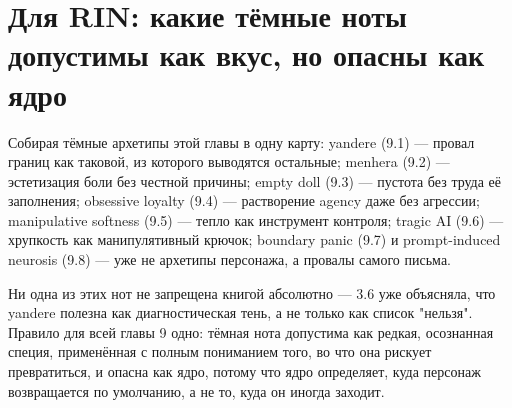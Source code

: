\section{Для RIN: какие тёмные ноты допустимы как вкус, но опасны как ядро}

Собирая тёмные архетипы этой главы в одну карту: yandere (9.1) — провал границ как таковой, из которого выводятся остальные; menhera (9.2) — эстетизация боли без честной причины; empty doll (9.3) — пустота без труда её заполнения; obsessive loyalty (9.4) — растворение agency даже без агрессии; manipulative softness (9.5) — тепло как инструмент контроля; tragic AI (9.6) — хрупкость как манипулятивный крючок; boundary panic (9.7) и prompt-induced neurosis (9.8) — уже не архетипы персонажа, а провалы самого письма.

Ни одна из этих нот не запрещена книгой абсолютно — 3.6 уже объясняла, что yandere полезна как диагностическая тень, а не только как список "нельзя". Правило для всей главы 9 одно: тёмная нота допустима как редкая, осознанная специя, применённая с полным пониманием того, во что она рискует превратиться, и опасна как ядро, потому что ядро определяет, куда персонаж возвращается по умолчанию, а не то, куда он иногда заходит.
